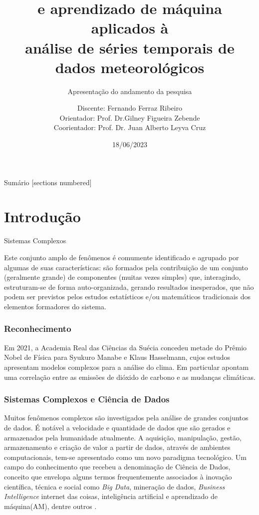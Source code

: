 \documentclass[11pt, aspectratio=169]{beamer}
\title{\dmc e aprendizado de máquina aplicados à\\análise de séries temporais de dados meteorológicos}
\subtitle{Apresentação do andamento da pesquisa}
\date{18/06/2023}
\author{Discente: Fernando Ferraz Ribeiro \\Orientador: Prof. Dr.Gilney Figueira Zebende \\Coorientador: Prof. Dr. Juan Alberto Leyva Cruz}
\institute{UEFS PPGM - Feira de Santana, BA}
\begin{document}
\maketitle

\begin{frame}{Sumário}
  [sections numbered]
  \tableofcontents[hideallsubsections]
\end{frame}

\section{Introdução}

\begin{frame}[fragile]{Sistemas Complexos}

  Este conjunto amplo de fenômenos é comumente identificado e agrupado por algumas de suas características: são formados pela contribuição de um conjunto (geralmente grande) de componentes (muitas vezes simples) que, interagindo, estruturam-se de forma auto-organizada, gerando resultados inesperados, que não podem ser previstos pelos estudos estatísticos e/ou matemáticos tradicionais dos elementos formadores do sistema.

\end{frame}

\begin{frame}
  \frametitle{Reconhecimento}

  Em 2021, a Academia Real das Ciências da Suécia concedeu metade do Prêmio Nobel de Física para Syukuro Manabe e Klaus Hasselmann, cujos estudos apresentam modelos complexos para a análise do clima. Em particular apontam uma correlação entre as emissões de dióxido de carbono e as mudanças climáticas.

\end{frame}

\begin{frame}
  \frametitle{Sistemas Complexos e Ciência de Dados}

  Muitos fenômenos complexos são investigados pela análise de grandes conjuntos de dados. É notável a velocidade e quantidade de dados que são gerados e armazenados pela humanidade atualmente. A aquisição, manipulação, gestão, armazenamento e criação de valor a partir de dados, através de ambientes computacionais, tem-se apresentado como um novo paradigma tecnológico. Um campo do conhecimento que recebeu a denominação de Ciência de Dados, conceito que envelopa alguns termos frequentemente associados à inovação científica, técnica e social como \emph{Big Data}, mineração de dados, \emph{Business Intelligence} internet das coisas, inteligência artificial e aprendizado de máquina(AM), dentre outros \cite[p. 12-13]{EMCdata2015}.

\end{frame}
\end{document}
